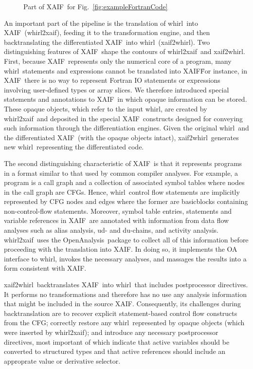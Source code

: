 \documentclass[11pt]{article}
\newcommand{\basicblock}{basicblock}
\newcommand{\OpenAnalysis}{OpenAnalysis}
\newcommand{\xaif}{XAIF}
\newcommand{\whirl}{whirl}
\newcommand{\whirlToxaif}{whirl2xaif}
\newcommand{\xaifTowhirl}{xaif2whirl}
\newcommand{\reffig}[1]{{Fig.~\ref{#1}}}
\begin{document}
\begin{figure}
  \scriptsize
  \caption{Part of \xaif\ for \reffig{fig:exampleFortranCode}}\label{fig:exampleXaifCode}
\end{figure}


An important part of the pipeline is the translation of \whirl\ into
\xaif\ (\whirlToxaif), feeding it to the transformation engine, and
then backtranslating the differentiated \xaif\ into \whirl\
(\xaifTowhirl).  Two distinguishing features of \xaif\ shape the
contours of \whirlToxaif\ and \xaifTowhirl.  First, because \xaif\
represents only the numerical core of a program, many \whirl\
statements and expressions cannot be translated into \xaif\.  For
instance, in \xaif\ there is no way to represent Fortran IO statements
or expressions involving user-defined types or array slices.  We
therefore introduced special statements and annotations to \xaif\ in
which opaque information can be stored.  These opaque objects, which
refer to the input \whirl, are created by \whirlToxaif\ and deposited
in the special \xaif\ constructs designed for conveying such
information through the differentiation engines.  Given the original
\whirl\ and the differentiated \xaif\ (with the opaque objects
intact), \xaifTowhirl\ generates new \whirl\ representing the
differentiated code.  

The second distinguishing characteristic of \xaif\ is that it
represents programs in a format similar to that used by common
compiler analyses.  For example, a program is a call graph and a
collection of associated symbol tables where nodes in the call graph
are CFGs.  Hence, \whirl\ control flow statements are implicitly
represented by CFG nodes and edges where the former are {\basicblock}s
containing non-control-flow statements.  Moreover, symbol table
entries, statements and variable references in \xaif\ are annotated
with information from data flow analyses such as alias analysis, ud-
and du-chains, and activity analysis.  \whirlToxaif\ uses the
\OpenAnalysis\ package to collect all of this information before
proceeding with the translation into \xaif.  In doing so, it
implements the OA interface to \whirl, invokes the necessary analyses,
and massages the results into a form consistent with \xaif.

\xaifTowhirl\ backtranslates \xaif\ into \whirl\ that includes
postprocessor directives.  It performs no transformations and
therefore has no use any analysis information that might be included
in the source \xaif.  Consequently, its challenges during
backtranslation are to recover explicit statement-based control flow
constructs from the CFG; correctly restore any \whirl\ represented by
opaque objects (which were inserted by \whirlToxaif); and introduce
any necessary postprocessor directives, most important of which
indicate that active variables should be converted to structured types
and that active references should include an approprate value or
derivative selector.
\end{document}
